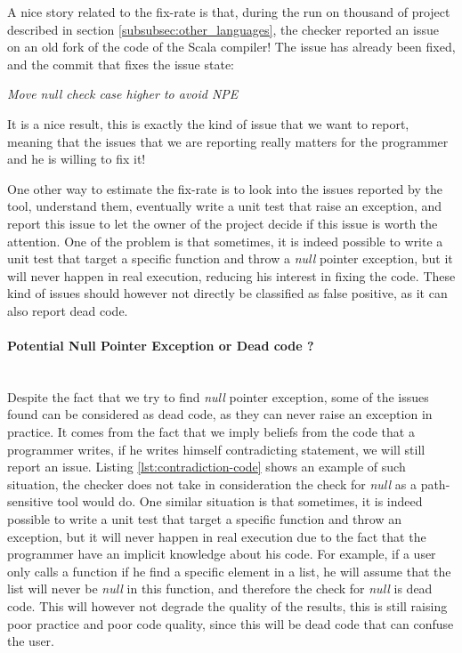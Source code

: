 A nice story related to the fix-rate is that, during the run on thousand of project described in section \ref{subsubsec:other_languages}, the checker reported an issue on an old fork of the code of the Scala compiler! 
The issue has already been fixed, and the commit that fixes the issue state:

\begin{displayquote}
	\centering
	\textit{Move null check case higher to avoid NPE}
\end{displayquote}

It is a nice result, this is exactly the kind of issue that we want to report, meaning that the issues that we are reporting really matters for the programmer and he is willing to fix it!

One other way to estimate the fix-rate is to look into the issues reported by the tool, understand them, eventually write a unit test that raise an exception, and report this issue to let the owner of the project decide if this issue is worth the attention.
One of the problem is that sometimes, it is indeed possible to write a unit test that target a specific function and throw a \emph{null} pointer exception, but it will never happen in real execution, reducing his interest in fixing the code.
These kind of issues should however not directly be classified as false positive, as it can also report dead code.



\paragraph{Potential Null Pointer Exception or Dead code ?}\mbox{}\\
\label{subsubsec:dead_code}
Despite the fact that we try to find \emph{null} pointer exception, some of the issues found can be considered as dead code, as they can never raise an exception in practice.
It comes from the fact that we imply beliefs from the code that a programmer writes, if he writes himself contradicting statement, we will still report an issue.
Listing \ref{lst:contradiction-code} shows an example of such situation, the checker does not take in consideration the check for \emph{null} as a path-sensitive tool would do. \newline
One similar situation is that sometimes, it is indeed possible to write a unit test that target a specific function and throw an exception, but it will never happen in real execution due to the fact that the programmer have an implicit knowledge about his code. 
For example, if a user only calls a function if he find a specific element in a list, he will assume that the list will never be \emph{null} in this function, and therefore the check for \emph{null} is dead code. 
This will however not degrade the quality of the results, this is still raising poor practice and poor code quality, since this will be dead code that can confuse the user.



